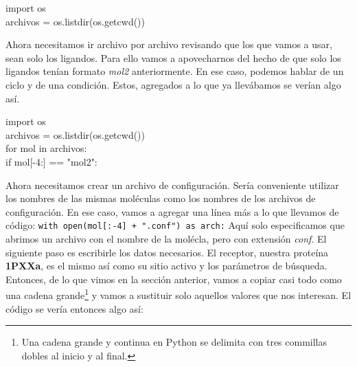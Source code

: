 \documentclass[10pt,letterpaper]{article}
\newcommand{\inlinecode}[1]{
\colorbox{light-gray}{\texttt{#1}}
}
\newenvironment{Code}
{
\begin{lrbox}{\selvestebox}%
\begin{minipage}{\dimexpr\columnwidth-2\fboxsep\relax}
\fontfamily{\ttdefault}\selectfont
}
{\end{minipage}\end{lrbox}%
\begin{center}
\colorbox{light-gray}{\usebox{\selvestebox}}
\end{center}
}
\begin{document}
\begin{Code}
import os\\
archivos = os.listdir(os.getcwd())
\end{Code}

Ahora necesitamos ir archivo por archivo revisando que los que vamos a usar, sean solo los ligandos. Para ello vamos a apovecharnos del hecho de que solo los ligandos ten\'ian formato \emph{mol2} anteriormente. En ese caso, podemos hablar de un ciclo y de una condici\'on. Estos, agregados a lo que ya llev\'abamos se ver\'ian algo as\'i.

\begin{Code}
import os\\
archivos = os.listdir(os.getcwd())\\
for mol in archivos:\\
\hspace*{6mm}if mol[-4:] == "mol2":
\end{Code}

Ahora necesitamos crear un archivo de configuraci\'on. Ser\'ia conveniente utilizar los nombres de las mismas mol\'eculas como los nombres de los archivos de configuraci\'on. En ese caso, vamos a agregar una l\'inea m\'as a lo que llevamos de c\'odigo: \inlinecode{with open(mol[:-4] + ".conf") as arch:} Aqu\'i solo especificamos que abrimos un archivo con el nombre de la mol\'ecla, pero con extensi\'on \emph{conf}. El siguiente paso es escribirle los datos necesarios. El receptor, nuestra prote\'ina \textbf{1PXXa}, es el mismo as\'i como su sitio activo y los par\'ametros de b\'usqueda. Entonces, de lo que vimos en la secci\'on anterior, vamos a copiar casi todo como una cadena grande\footnote{Una cadena grande y continua en Python se delimita con tres commillas dobles al inicio y al final.} y vamos a sustituir solo aquellos valores que nos interesan. El c\'odigo se ver\'ia entonces algo as\'i:
\end{document}
